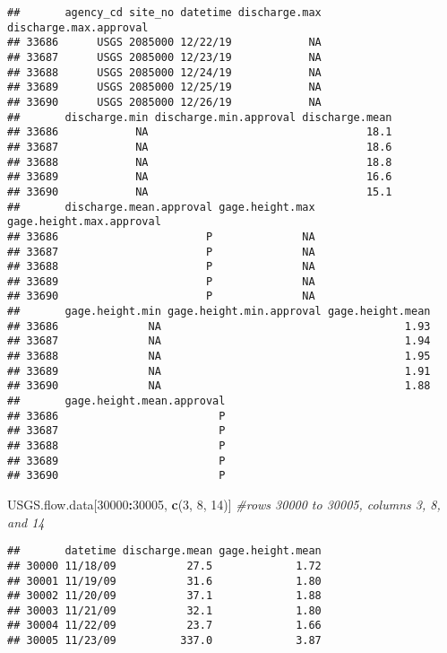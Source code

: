 \documentclass[]{article}
\newenvironment{Shaded}{\begin{snugshade}}{\end{snugshade}}
\newcommand{\CommentTok}[1]{\textcolor[rgb]{0.56,0.35,0.01}{\textit{#1}}}
\newcommand{\DecValTok}[1]{\textcolor[rgb]{0.00,0.00,0.81}{#1}}
\newcommand{\KeywordTok}[1]{\textcolor[rgb]{0.13,0.29,0.53}{\textbf{#1}}}
\newcommand{\NormalTok}[1]{#1}
\newcommand{\OperatorTok}[1]{\textcolor[rgb]{0.81,0.36,0.00}{\textbf{#1}}}
\begin{document}
\begin{verbatim}
##       agency_cd site_no datetime discharge.max discharge.max.approval
## 33686      USGS 2085000 12/22/19            NA                       
## 33687      USGS 2085000 12/23/19            NA                       
## 33688      USGS 2085000 12/24/19            NA                       
## 33689      USGS 2085000 12/25/19            NA                       
## 33690      USGS 2085000 12/26/19            NA                       
##       discharge.min discharge.min.approval discharge.mean
## 33686            NA                                  18.1
## 33687            NA                                  18.6
## 33688            NA                                  18.8
## 33689            NA                                  16.6
## 33690            NA                                  15.1
##       discharge.mean.approval gage.height.max gage.height.max.approval
## 33686                       P              NA                         
## 33687                       P              NA                         
## 33688                       P              NA                         
## 33689                       P              NA                         
## 33690                       P              NA                         
##       gage.height.min gage.height.min.approval gage.height.mean
## 33686              NA                                      1.93
## 33687              NA                                      1.94
## 33688              NA                                      1.95
## 33689              NA                                      1.91
## 33690              NA                                      1.88
##       gage.height.mean.approval
## 33686                         P
## 33687                         P
## 33688                         P
## 33689                         P
## 33690                         P
\end{verbatim}

\begin{Shaded}
\begin{Highlighting}[]
\NormalTok{USGS.flow.data[}\DecValTok{30000}\OperatorTok{:}\DecValTok{30005}\NormalTok{, }\KeywordTok{c}\NormalTok{(}\DecValTok{3}\NormalTok{, }\DecValTok{8}\NormalTok{, }\DecValTok{14}\NormalTok{)] }\CommentTok{#rows 30000 to 30005, columns 3, 8, and 14}
\end{Highlighting}
\end{Shaded}

\begin{verbatim}
##       datetime discharge.mean gage.height.mean
## 30000 11/18/09           27.5             1.72
## 30001 11/19/09           31.6             1.80
## 30002 11/20/09           37.1             1.88
## 30003 11/21/09           32.1             1.80
## 30004 11/22/09           23.7             1.66
## 30005 11/23/09          337.0             3.87
\end{verbatim}
\end{document}
